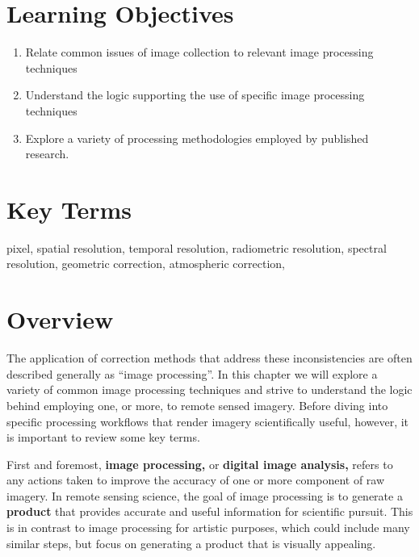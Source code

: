 \documentclass[
]{book}
\providecommand{\tightlist}{%
  \setlength{\itemsep}{0pt}\setlength{\parskip}{0pt}}
\begin{document}
\hypertarget{learning-objectives-12}{%
\section*{Learning Objectives}\label{learning-objectives-12}}

\begin{enumerate}
\def\labelenumi{\arabic{enumi}.}
\tightlist
\item
  Relate common issues of image collection to relevant image
  processing techniques
\item
  Understand the logic supporting the use of specific image processing
  techniques
\item
  Explore a variety of processing methodologies employed by published
  research.
\end{enumerate}

\hypertarget{key-terms-12}{%
\section*{Key Terms}\label{key-terms-12}}

pixel, spatial resolution, temporal resolution, radiometric resolution,
spectral resolution, geometric correction, atmospheric correction,

\hypertarget{overview}{%
\section{Overview}\label{overview}}

The application of correction methods that address these inconsistencies
are often described generally as ``image processing''. In this chapter we
will explore a variety of common image processing techniques and strive
to understand the logic behind employing one, or more, to remote sensed
imagery. Before diving into specific processing workflows that render
imagery scientifically useful, however, it is important to review some
key terms.

First and foremost, \textbf{image processing,} or \textbf{digital image analysis,}
refers to any actions taken to improve the accuracy of one or more
component of raw imagery. In remote sensing science, the goal of image
processing is to generate a \textbf{product} that provides accurate and useful
information for scientific pursuit. This is in contrast to image
processing for artistic purposes, which could include many similar
steps, but focus on generating a product that is visually appealing.
\end{document}
